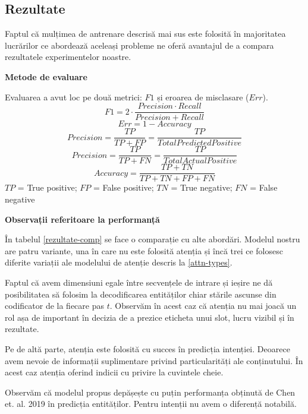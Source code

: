 \subsection{Rezultate}
Faptul că mulțimea de antrenare descrisă mai sus este folosită în majoritatea lucrărilor ce abordează aceleași probleme ne oferă avantajul de a compara rezultatele experimentelor noastre.

\textbf{Metode de evaluare}

Evaluarea a avut loc pe două metrici: $F1$ și eroarea de misclasare ($Err$).
$$ F1 = 2 \cdot \frac{Precision \cdot Recall}{Precision + Recall} $$
$$ Err = 1 - Accuracy $$
$$ Precision = \frac{TP}{TP+FP} = \frac{TP}{Total Predicted Positive} $$
$$ Precision = \frac{TP}{TP+FN} = \frac{TP}{Total Actual Positive} $$
$$ Accuracy = \frac{TP+TN}{TP + TN + FP + FN} $$
$TP$ = True positive; $FP$ = False positive; $TN$ = True negative; $FN$ = False negative

\textbf{Observații referitoare la performanță}

În tabelul \ref{rezultate-comp} se face o comparație cu alte abordări. Modelul nostru are patru variante, una în care nu este folosită atenția și încă trei ce folosesc diferite variații ale modelului de atenție descris la \ref{attn-types}.

Faptul că avem dimensiuni egale între secvențele de intrare și ieșire ne dă posibilitatea să folosim la decodificarea entităților chiar stările ascunse din codificator de la fiecare pas $t$. Observăm în acest caz că atenția nu mai joacă un rol așa de important în decizia de a prezice eticheta unui slot, lucru vizibil și în rezultate.

Pe de altă parte, atenția este folosită cu succes în predicția intenției. Deoarece avem nevoie de informații suplimentare privind particularități ale conținutului. În acest caz atenția oferind indicii cu privire la cuvintele cheie.

Observăm că modelul propus depășește cu puțin performanța obținută de Chen et. al. 2019 \cite{joint-bert} în predicția entităților. Pentru intenții nu avem o diferență notabilă.

